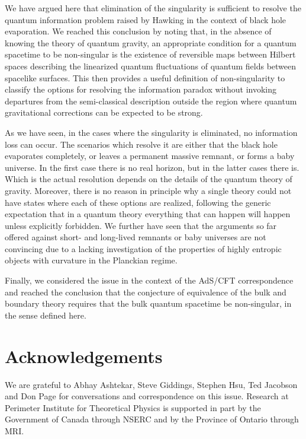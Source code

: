 \documentclass[12pt]{article}
\begin{document}
We have argued here that elimination of the singularity is sufficient to resolve the quantum information problem raised by Hawking in the context of black hole evaporation.  We reached this conclusion by noting that, in the absence of knowing the theory of quantum gravity, an appropriate condition for a quantum spacetime to be non-singular is the existence of reversible maps between Hilbert spaces describing the linearized quantum fluctuations of quantum
fields between spacelike surfaces. This then provides a useful definition of non-singularity to 
classify the options for resolving the information paradox without invoking departures from the semi-classical description outside
the region where quantum gravitational corrections can be expected to be strong. 

As we have seen, in the cases where the singularity is eliminated, no information loss can occur. The scenarios which resolve it are either that the black hole evaporates completely, or leaves a permanent massive remnant, or forms a baby universe. In the first case there is no real horizon, but in the latter cases there is.  Which is the actual resolution depends on the details of the quantum theory of gravity. Moreover, there is no reason in principle why a single theory could not have states where each of these options are realized, following the generic expectation that in a
quantum theory everything that can happen will happen unless explicitly forbidden. We further have seen that the arguments so far offered 
against short- and long-lived remnants or baby universes are not convincing due to a lacking investigation of the properties of highly
entropic objects with curvature in the Planckian regime.  

Finally, we considered the issue in the context of the AdS/CFT correspondence and reached the conclusion that the conjecture of 
equivalence of the bulk and boundary theory requires that the bulk quantum spacetime be non-singular, in the sense defined here. 

\section*{Acknowledgements}

We are grateful to Abhay Ashtekar, Steve Giddings, Stephen Hsu, Ted Jacobson and Don Page for conversations and correspondence on this issue.  
Research at Perimeter Institute for Theoretical Physics is supported in
part by the Government of Canada through NSERC and by the Province of
Ontario through MRI.
\end{document}
